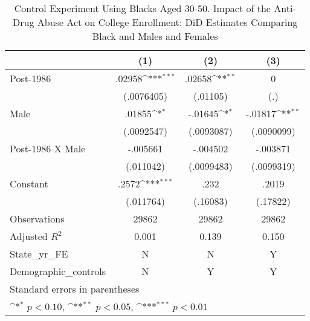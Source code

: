 \begin{table}[htbp]\centering
\def\sym#1{\ifmmode^{#1}\else\(^{#1}\)\fi}
\caption{Control Experiment Using Blacks Aged 30-50. Impact of the Anti-Drug Abuse Act on College Enrollment: DiD Estimates Comparing Black and Males and Females}
\begin{tabular}{l*{3}{c}}
\hline\hline
                    &\multicolumn{1}{c}{(1)}         &\multicolumn{1}{c}{(2)}         &\multicolumn{1}{c}{(3)}         \\
\hline
Post-1986           &      .02958\sym{***}&      .02658\sym{**} &           0         \\
                    &  (.0076405)         &    (.01105)         &         (.)         \\
[1em]
Male                &      .01855\sym{*}  &     -.01645\sym{*}  &     -.01817\sym{**} \\
                    &  (.0092547)         &  (.0093087)         &  (.0090099)         \\
[1em]
Post-1986 X Male    &    -.005661         &    -.004502         &    -.003871         \\
                    &   (.011042)         &  (.0099483)         &  (.0099319)         \\
[1em]
Constant            &       .2572\sym{***}&        .232         &       .2019         \\
                    &   (.011764)         &    (.16083)         &    (.17822)         \\
\hline
Observations        &       29862         &       29862         &       29862         \\
Adjusted \(R^{2}\)  &       0.001         &       0.139         &       0.150         \\
State\_yr\_FE         &           N         &           N         &           Y         \\
Demographic\_controls&           N         &           Y         &           Y         \\
\hline\hline
\multicolumn{4}{l}{\footnotesize Standard errors in parentheses}\\
\multicolumn{4}{l}{\footnotesize \sym{*} \(p<0.10\), \sym{**} \(p<0.05\), \sym{***} \(p<0.01\)}\\
\end{tabular}
\end{table}
